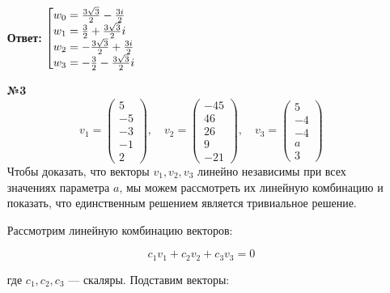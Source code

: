 \documentclass[a4paper]{article}
\makeatletter
\newcommand{\gath}[1]{\left[ \begin{array}{@{}l@{}} #1 \end{array} \right.}
\makeatother
\begin{document}
\begin{enumerate}
\begin{enumerate}
    \end{enumerate}
    \textbf{Ответ: }
    $\gath{
        w_0 = \frac{3\sqrt{3}}{2} - \frac{3i}{2}\\
        w_1 = \frac{3}{2} + \frac{3\sqrt{3}}{2}i\\
        w_2 = -\frac{3\sqrt{3}}{2} + \frac{3i}{2}\\
        w_3 = -\frac{3}{2} - \frac{3\sqrt{3}}{2} i
    }$\\

    \item[\textbf{№3}]$$
        v_{1} = \begin{pmatrix}
        5 \\
        -5 \\
        -3 \\
        -1 \\
        2
        \end{pmatrix}, \quad 
        v_{2} = \begin{pmatrix}
        -45 \\
        46 \\
        26 \\
        9 \\
        -21
        \end{pmatrix}, \quad 
        v_{3} = \begin{pmatrix}
        5 \\
        -4 \\
        -4 \\
        a \\
        3
        \end{pmatrix}
        $$
    Чтобы доказать, что векторы $ v_1, v_2, v_3 $ линейно независимы при всех значениях параметра $ a $, мы можем рассмотреть их линейную комбинацию и показать, что единственным решением является тривиальное решение.
    
    Рассмотрим линейную комбинацию векторов:

    $$
    c_1 v_1 + c_2 v_2 + c_3 v_3 = 0
    $$

    где $ c_1, c_2, c_3 $ — скаляры. Подставим векторы:
    

\end{enumerate}
\end{document}
